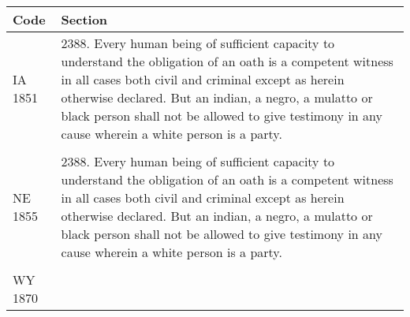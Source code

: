 \documentclass[12pt,]{article}
\begin{document}
\begin{longtable}[]{@{}ll@{}}
\toprule
\begin{minipage}[b]{0.20\columnwidth}\raggedright
Code\strut
\end{minipage} & \begin{minipage}[b]{0.74\columnwidth}\raggedright
Section\strut
\end{minipage}\tabularnewline
\midrule
\endhead
\begin{minipage}[t]{0.20\columnwidth}\raggedright
IA 1851\strut
\end{minipage} & \begin{minipage}[t]{0.74\columnwidth}\raggedright
2388. Every human being of sufficient capacity to understand the
obligation of an oath is a competent witness in all cases both civil and
criminal except as herein otherwise declared. But an indian, a negro, a
mulatto or black person shall not be allowed to give testimony in any
cause wherein a white person is a party.\strut
\end{minipage}\tabularnewline
\begin{minipage}[t]{0.20\columnwidth}\raggedright
\strut
\end{minipage} & \begin{minipage}[t]{0.74\columnwidth}\raggedright
\strut
\end{minipage}\tabularnewline
\begin{minipage}[t]{0.20\columnwidth}\raggedright
NE 1855\strut
\end{minipage} & \begin{minipage}[t]{0.74\columnwidth}\raggedright
2388. Every human being of sufficient capacity to understand the
obligation of an oath is a competent witness in all cases both civil and
criminal except as herein otherwise declared. But an indian, a negro, a
mulatto or black person shall not be allowed to give testimony in any
cause wherein a white person is a party.\strut
\end{minipage}\tabularnewline
\begin{minipage}[t]{0.20\columnwidth}\raggedright
\strut
\end{minipage} & \begin{minipage}[t]{0.74\columnwidth}\raggedright
\strut
\end{minipage}\tabularnewline
\begin{minipage}[t]{0.20\columnwidth}\raggedright
WY 1870\strut
\end{minipage} & \begin{minipage}[t]{0.74\columnwidth}\raggedright

\end{minipage}
\end{longtable}
\end{document}
